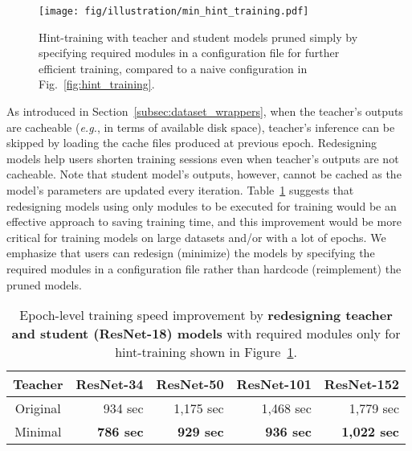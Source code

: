 \documentclass[runningheads]{llncs}
\begin{document}
\begin{figure}[t]
    \centering
    \texttt{[image: fig/illustration/min\_hint\_training.pdf]}
    \caption{Hint-training with teacher and student models pruned simply by specifying required modules in a configuration file for further efficient training, compared to a naive configuration in Fig.~\ref{fig:hint_training}.}
    \label{fig:min_hint_training}
\end{figure}

As introduced in Section~\ref{subsec:dataset_wrappers}, when the teacher's outputs are cacheable (\emph{e.g.}, in terms of available disk space), teacher's inference can be skipped by loading the cache files produced at previous epoch.
Redesigning models help users shorten training sessions even when teacher's outputs are not cacheable.
Note that student model's outputs, however, cannot be cached as the model's parameters are updated every iteration.
Table~\ref{table:model_redesign} suggests that redesigning models using only modules to be executed for training would be an effective approach to saving training time, and this improvement would be more critical for training models on large datasets and/or with a lot of epochs.
We emphasize that users can redesign (minimize) the models by specifying the required modules in a configuration file rather than hardcode (reimplement) the pruned models.


\begin{table}[t]
    \caption{Epoch-level training speed improvement by \textbf{redesigning teacher and student (ResNet-18) models} with required modules only for hint-training shown in Figure~\ref{fig:min_hint_training}.}
    \begin{center}
    \bgroup
    \setlength{\tabcolsep}{0.3em}
    \def\arraystretch{1.1}
    \small
        \begin{tabular}{|c|r|r|r|r|}
            \hline
            \textbf{Teacher} & \textbf{ResNet-34} & \textbf{ResNet-50} & \textbf{ResNet-101} & \textbf{ResNet-152} \\ \hline
            Original & 934 sec & 1,175 sec & 1,468 sec & 1,779 sec \\
            Minimal & {\bf 786 sec} & {\bf 929 sec} & {\bf 936 sec} & {\bf 1,022 sec} \\
            \hline
        \end{tabular}
    \egroup
    \end{center}
\label{table:model_redesign}
\end{table}
\end{document}
